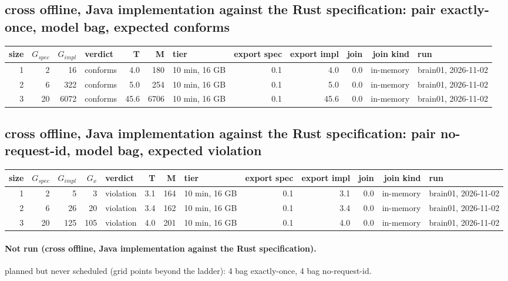 \documentclass[10pt]{article}
\begin{document}
\subsection*{cross offline, Java implementation against the Rust specification: pair \textsf{exactly-once}, model bag, expected conforms}
\begin{longtable}{@{}rrrlrrlrrrrl@{}}
\toprule
size & $G_{\mathit{spec}}$ & $G_{\mathit{impl}}$ & verdict & T & M & tier & export spec & export impl & join & join kind & run \\
\midrule
\endhead
\color{red} 1 & 2 & 16 & conforms & 4.0 & 180 & 10 min, 16 GB & 0.1 & 4.0 & 0.0 & in-memory & brain01, 2026-11-02 \\
\color{red} 2 & 6 & 322 & conforms & 5.0 & 254 & 10 min, 16 GB & 0.1 & 5.0 & 0.0 & in-memory & brain01, 2026-11-02 \\
\color{red} 3 & 20 & 6072 & conforms & 45.6 & 6706 & 10 min, 16 GB & 0.1 & 45.6 & 0.0 & in-memory & brain01, 2026-11-02 \\
\bottomrule
\end{longtable}
\subsection*{cross offline, Java implementation against the Rust specification: pair \textsf{no-request-id}, model bag, expected violation}
\begin{longtable}{@{}rrrrlrrlrrrrl@{}}
\toprule
size & $G_{\mathit{spec}}$ & $G_{\mathit{impl}}$ & $G_x$ & verdict & T & M & tier & export spec & export impl & join & join kind & run \\
\midrule
\endhead
\color{red} 1 & 2 & 5 & 3 & violation & 3.1 & 164 & 10 min, 16 GB & 0.1 & 3.1 & 0.0 & in-memory & brain01, 2026-11-02 \\
\color{red} 2 & 6 & 26 & 20 & violation & 3.4 & 162 & 10 min, 16 GB & 0.1 & 3.4 & 0.0 & in-memory & brain01, 2026-11-02 \\
\color{red} 3 & 20 & 125 & 105 & violation & 4.0 & 201 & 10 min, 16 GB & 0.1 & 4.0 & 0.0 & in-memory & brain01, 2026-11-02 \\
\bottomrule
\end{longtable}
\paragraph{Not run (cross offline, Java implementation against the Rust specification).}
planned but never scheduled (grid points beyond the ladder): 4 bag exactly-once, 4 bag no-request-id.\par
\end{document}
